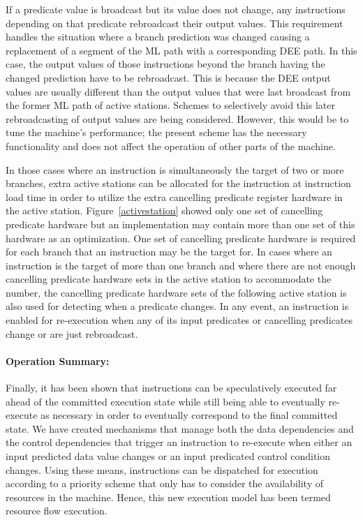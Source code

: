 \documentclass[10pt,dvips]{article}
\begin{document}
If a predicate value is broadcast but its value does not change, any
instructions depending on that predicate rebroadcast their output
values.  This requirement handles the situation where a branch
prediction was changed causing a replacement of a segment of the ML
path with a corresponding DEE path.  In this case, the output values of
those instructions beyond the branch having the changed prediction
have to be rebroadcast. This is because the DEE output values
are usually different than the output
values that were last broadcast from the former ML path of active
stations.  Schemes to selectively avoid this later rebroadcasting of
output values are being considered. However, this would be to tune
the machine's performance; the present scheme has the necessary
functionality and does not affect the operation of other parts of the
machine.

In those cases where an instruction is simultaneously the target of two
or more branches, extra active stations can be allocated for the
instruction at instruction load time in order to utilize the extra
cancelling predicate register hardware in the active station.
Figure~\ref{activestation} showed only one set of cancelling predicate
hardware but an implementation may contain more than one set of this
hardware as an optimization.  One set of cancelling predicate hardware
is required for each branch that an instruction may be the target for.
In cases where an instruction is the target of more than one branch and
where there are not enough cancelling predicate hardware sets in the
active station to accommodate the number, the cancelling predicate
hardware sets of the following active station is also used for
detecting when a predicate changes.  In any event, an instruction is
enabled for re-execution when any of its input predicates or cancelling
predicates change or are just rebroadcast.

\paragraph{Operation Summary: }
Finally, it has been shown that instructions can be speculatively
executed far ahead of the committed execution state while still
being able to eventually re-execute as necessary in order to
eventually correspond to the final committed state.
We have created mechanisms that manage both the data dependencies and
the control dependencies that trigger an instruction to re-execute
when either an input predicted data value changes or an input
predicated
control condition changes.  Using these means, instructions
can be dispatched for execution according to a priority scheme
that only has to consider the availability of resources
in the machine.  Hence, this new execution model has been termed
resource flow execution.
\end{document}
